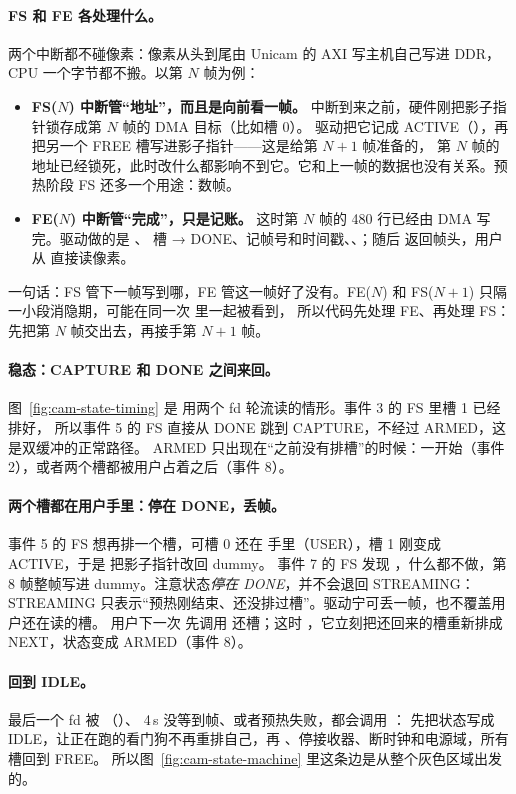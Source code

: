 \paragraph{FS 和 FE 各处理什么。}
两个中断都不碰像素：像素从头到尾由 Unicam 的 AXI 写主机自己写进 DDR，CPU 一个字节都不搬。以第 $N$ 帧为例：
\begin{itemize}
  \item \textbf{FS($N$) 中断管“地址”，而且是向前看一帧。} 中断到来之前，硬件刚把影子指针锁存成第 $N$ 帧的 DMA 目标（比如槽 0）。
        驱动把它记成 ACTIVE（），再把另一个 FREE 槽写进影子指针——这是给第 $N{+}1$ 帧准备的，
        第 $N$ 帧的地址已经锁死，此时改什么都影响不到它。它和上一帧的数据也没有关系。预热阶段 FS 还多一个用途：数帧。
  \item \textbf{FE($N$) 中断管“完成”，只是记账。} 这时第 $N$ 帧的 480 行已经由 DMA 写完。驱动做的是 、
        槽 → DONE、记帧号和时间戳、、；随后  返回帧头，用户从  直接读像素。
\end{itemize}
一句话：FS 管下一帧写到哪，FE 管这一帧好了没有。FE($N$) 和 FS($N{+}1$) 只隔一小段消隐期，可能在同一次  里一起被看到，
所以代码先处理 FE、再处理 FS：先把第 $N$ 帧交出去，再接手第 $N{+}1$ 帧。



\paragraph{稳态：CAPTURE 和 DONE 之间来回。}
图~\ref{fig:cam-state-timing} 是  用两个 fd 轮流读的情形。事件 3 的 FS 里槽 1 已经排好，
所以事件 5 的 FS 直接从 DONE 跳到 CAPTURE，不经过 ARMED，这是双缓冲的正常路径。
ARMED 只出现在“之前没有排槽”的时候：一开始（事件 2），或者两个槽都被用户占着之后（事件 8）。

\paragraph{两个槽都在用户手里：停在 DONE，丢帧。}
事件 5 的 FS 想再排一个槽，可槽 0 还在  手里（USER），槽 1 刚变成 ACTIVE，于是  把影子指针改回 dummy。
事件 7 的 FS 发现 ，什么都不做，第 8 帧整帧写进 dummy。注意状态\emph{停在 DONE}，并不会退回 STREAMING：
STREAMING 只表示“预热刚结束、还没排过槽”。驱动宁可丢一帧，也不覆盖用户还在读的槽。
用户下一次  先调用  还槽；这时 ，它立刻把还回来的槽重新排成 NEXT，状态变成 ARMED（事件 8）。

\paragraph{回到 IDLE。}
最后一个 fd 被 （）、 4\,s 没等到帧、或者预热失败，都会调用 ：
先把状态写成 IDLE，让正在跑的看门狗不再重排自己，再 、停接收器、断时钟和电源域，所有槽回到 FREE。
所以图~\ref{fig:cam-state-machine} 里这条边是从整个灰色区域出发的。
